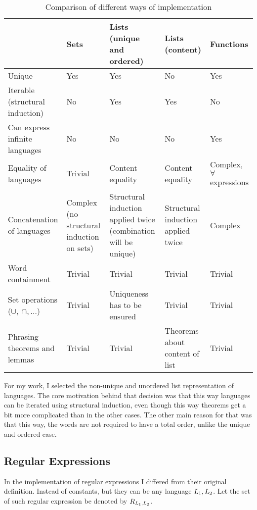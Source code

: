 \renewcommand{\arraystretch}{1.5}
\begin{center}
	\begin{table}
		\begin{tabular}{| p{3cm} | p{3cm} | p{3cm}| p{3cm} | p{3cm} |}
			
			\hline
			& Sets & Lists (unique and ordered) & Lists (content) & Functions \\ \hline
			Unique & Yes & Yes & No & Yes \\ \hline
			Iterable (structural induction) & No & Yes & Yes & No \\ \hline
			Can express infinite languages & No & No & No & Yes \\ \hline
			Equality of languages & Trivial & Content equality & Content equality & Complex, $\forall$ expressions \\ \hline
			Concatenation of languages & Complex (no structural induction on sets) & Structural induction applied twice (combination will be unique) & Structural induction applied twice & Complex \\ \hline
			Word containment & Trivial & Trivial & Trivial & Trivial \\ \hline
			Set operations ($\cup, ~ \cap, \ldots$) & Trivial & Uniqueness has to be ensured & Trivial & Trivial \\ \hline
			Phrasing theorems and lemmas & Trivial & Trivial & Theorems about content of list & Trivial \\ \hline
		\end{tabular}		
		\caption{\label{tab:implComparison}Comparison of different ways of implementation}
	\end{table}

\end{center}

For my work, I selected the non-unique and unordered list representation of languages. The core motivation behind that decision was that this way languages can be iterated using structural induction, even though this way theorems get a bit more complicated than in the other cases. The other main reason for that was that this way, the words are not required to have a total order, unlike the unique and ordered case.

\subsection{Regular Expressions}
\label{sect:regExImpl}

In the implementation of regular expressions I differed from their original definition. Instead of constants, but they can be any language $L_{1}, L_{2}$. Let the set of such regular expression be denoted by $R_{L_{1}, L_{2}}$.

